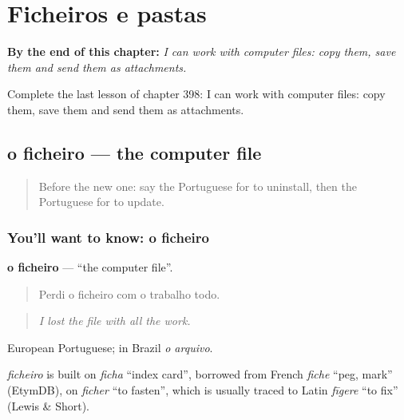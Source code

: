
\chapter{Ficheiros e pastas}
\label{ch:pt-ficheiros-e-pastas}

\begin{chapteropening}
\textbf{By the end of this chapter:} \emph{I can work with computer files: copy them, save them and send them as attachments.}

Complete the last lesson of chapter 398: I can work with computer files: copy them, save them and send them as attachments.
\end{chapteropening}

\section[o ficheiro]{o ficheiro — the computer file}

\label{lesson:PT-C398-ficheiro}



\begin{quote}
Before the new one: say the Portuguese for to uninstall, then the Portuguese for to update.
\end{quote}

\subsection*{You'll want to know: o ficheiro}
\textbf{o ficheiro} — \textquotedblleft{}the computer file\textquotedblright{}.

\begin{quote}
Perdi o ficheiro com o trabalho todo.
\end{quote}

\begin{quote}
\emph{I lost the file with all the work.}
\end{quote}

European Portuguese; in Brazil \emph{o arquivo}.

\begin{cousinweb}
\emph{ficheiro} is built on \emph{ficha} \textquotedblleft{}index card\textquotedblright{}, borrowed from French \emph{fiche} \textquotedblleft{}peg, mark\textquotedblright{} (EtymDB), on \emph{ficher} \textquotedblleft{}to fasten\textquotedblright{}, which is usually traced to Latin \emph{fīgere} \textquotedblleft{}to fix\textquotedblright{} (Lewis \& Short).
\end{cousinweb}


